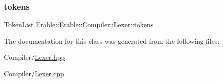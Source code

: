 \subsubsection{\texorpdfstring{tokens}{tokens}}
{\footnotesize\ttfamily Token\+List Erable\+::\+Erable\+::\+Compiler\+::\+Lexer\+::tokens\hspace{0.3cm}{\ttfamily [private]}}



The documentation for this class was generated from the following files\+:\begin{DoxyCompactItemize}
\item 
Compiler/\mbox{\hyperlink{_lexer_8hpp}{Lexer.\+hpp}}\item 
Compiler/\mbox{\hyperlink{_lexer_8cpp}{Lexer.\+cpp}}\end{DoxyCompactItemize}
